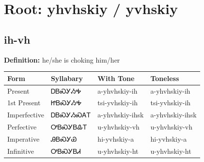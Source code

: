 \documentclass{article}%
\begin{document}
%
\normalsize%
\section*{Root: yhvhskiy / yvhskiy}%
\subsection*{ih-vh}%
\textbf{Definition: }%
he/she is choking him/her%
\\[0.5em]%
\begin{tabular}{|l|l|l|l|}%
\hline%
\textbf{Form}&\textbf{Syllabary}&\textbf{With Tone}&\textbf{Toneless}\\%
\hline%
Present&ᎠᏴᏍᎩᏱᎭ&a{-}yhvhskiy{-}ih&a{-}yhvhskiy{-}ih\\%
1st Present&ᏥᏴᏍᎩᏱᎭ&tsi{-}yvhskiy{-}ih&tsi{-}yvhskiy{-}ih\\%
Imperfective&ᎠᏴᏍᎩᏱᏍᎪᎢ&a{-}yhvhskiy{-}ihsk&a{-}yhvhskiy{-}ihsk\\%
Perfective&ᎤᏴᏍᎩᏴᎲᎢ&u{-}yhvhskiy{-}vh&u{-}yhvhskiy{-}vh\\%
Imperative&ᎯᏴᏍᎩᏯ&hi{-}yvhskiy{-}a&hi{-}yvhskiy{-}a\\%
Infinitive&ᎤᏴᏍᎩᏴᏗ&u{-}yhvhskiy{-}ht&u{-}yhvhskiy{-}ht\\%
\hline%
\end{tabular}%
\\[1em]%
\end{document}
